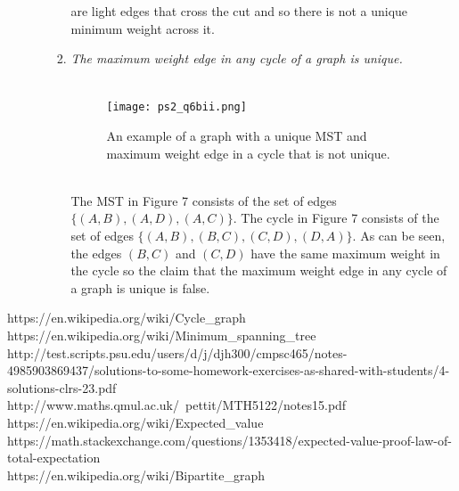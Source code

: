 \documentclass[12pt]{article}
\begin{document}
\begin{enumerate}
\begin{enumerate}
\begin{enumerate}
						are light edges that cross the cut and so there is not a unique minimum weight across it.\\
						\item \textit{The maximum weight edge in any cycle of a graph is unique.}\\
						\\
						\begin{figure}[h]
						\caption{An example of a graph with a unique MST and maximum weight edge in a cycle that is not unique.}
						\texttt{[image: ps2\_q6bii.png]}
						\centering
						\end{figure}
						\\
						The MST in Figure 7 consists of the set of edges $\{(A,B),(A,D),(A,C)\}$.  The cycle in Figure 7 consists of the set of edges $\{(A,B),(B,C),(C,D),(D,A)\}$.  
						As can be seen, the edges $(B,C)$ and $(C,D)$ have the same maximum weight in the cycle so the claim that the maximum weight edge in any cycle of a graph is unique is false.  
					\end{enumerate}
			\end{enumerate}
	
\end{enumerate}

\begin{thebibliography}{10}
	 https://en.wikipedia.org/wiki/Cycle\_graph\\
	 https://en.wikipedia.org/wiki/Minimum\_spanning\_tree\\
	 http://test.scripts.psu.edu/users/d/j/djh300/cmpsc465/notes-4985903869437/solutions-to-some-homework-exercises-as-shared-with-students/4-solutions-clrs-23.pdf\\
	 http://www.maths.qmul.ac.uk/~pettit/MTH5122/notes15.pdf\\
	 https://en.wikipedia.org/wiki/Expected\_value\\
	 https://math.stackexchange.com/questions/1353418/expected-value-proof-law-of-total-expectation\\
	 https://en.wikipedia.org/wiki/Bipartite\_graph
\end{thebibliography}
\end{document}
